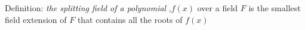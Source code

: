 \documentclass[preview]{standalone}
\begin{document}
\begin{center}
Definition: \textit{the splitting field of a polynomial },$f(x)$ over a field $F$ is the smallest field extension of $F$ that contains all the roots of $f(x)$
\end{center}
\end{document}
